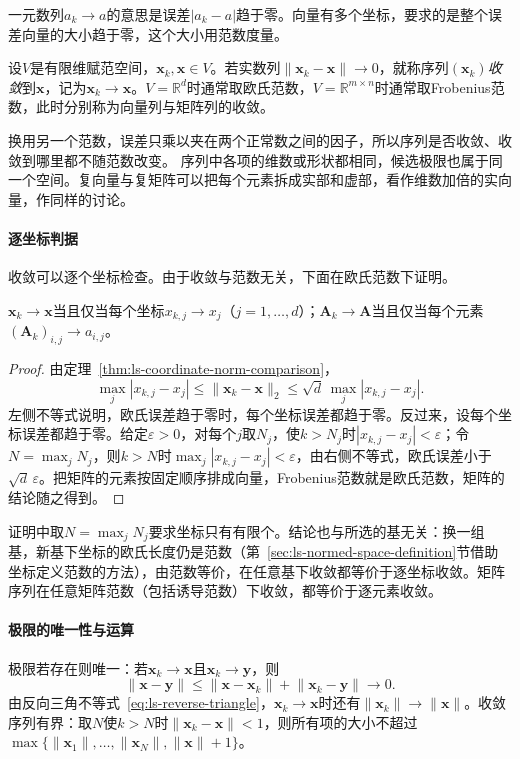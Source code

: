 一元数列$a_k\to a$的意思是误差$|a_k-a|$趋于零。向量有多个坐标，要求的是整个误差向量的大小趋于零，这个大小用范数度量。
\begin{definition}[向量列与矩阵列的收敛]
\label{def:multivariable-sequence-convergence}
设$V$是有限维赋范空间，$\bm x_k,\bm x\in V$。若实数列$\lVert\bm x_k-\bm x\rVert\to0$，就称序列$(\bm x_k)$\emph{收敛}到$\bm x$，记为$\bm x_k\to\bm x$。$V=\mathbb R^d$时通常取欧氏范数，$V=\mathbb R^{m\times n}$时通常取Frobenius范数，此时分别称为向量列与矩阵列的收敛。
\end{definition}
换用另一个范数，误差只乘以夹在两个正常数之间的因子，所以序列是否收敛、收敛到哪里都不随范数改变。
序列中各项的维数或形状都相同，候选极限也属于同一个空间。复向量与复矩阵可以把每个元素拆成实部和虚部，看作维数加倍的实向量，作同样的讨论。

\paragraph{逐坐标判据}
收敛可以逐个坐标检查。由于收敛与范数无关，下面在欧氏范数下证明。
\begin{theorem}[收敛等价于逐坐标收敛]
\label{thm:multivariable-coordinatewise-convergence}
$\bm x_k\to\bm x$当且仅当每个坐标$x_{k,j}\to x_j$（$j=1,\ldots,d$）；$\bm A_k\to\bm A$当且仅当每个元素$(\bm A_k)_{i,j}\to a_{i,j}$。
\end{theorem}
\begin{proof}
由定理~\ref{thm:ls-coordinate-norm-comparison}，
\[
 \max_j|x_{k,j}-x_j|\leq\lVert\bm x_k-\bm x\rVert_2\leq\sqrt d\,\max_j|x_{k,j}-x_j|.
\]
左侧不等式说明，欧氏误差趋于零时，每个坐标误差都趋于零。反过来，设每个坐标误差都趋于零。给定$\varepsilon>0$，对每个$j$取$N_j$，使$k>N_j$时$|x_{k,j}-x_j|<\varepsilon$；令$N=\max_jN_j$，则$k>N$时$\max_j|x_{k,j}-x_j|<\varepsilon$，由右侧不等式，欧氏误差小于$\sqrt d\,\varepsilon$。把矩阵的元素按固定顺序排成向量，Frobenius范数就是欧氏范数，矩阵的结论随之得到。
\end{proof}
证明中取$N=\max_jN_j$要求坐标只有有限个。结论也与所选的基无关：换一组基，新基下坐标的欧氏长度仍是范数（第~\ref{sec:ls-normed-space-definition}节借助坐标定义范数的方法），由范数等价，在任意基下收敛都等价于逐坐标收敛。矩阵序列在任意矩阵范数（包括诱导范数）下收敛，都等价于逐元素收敛。

\paragraph{极限的唯一性与运算}
极限若存在则唯一：若$\bm x_k\to\bm x$且$\bm x_k\to\bm y$，则
\[
 \lVert\bm x-\bm y\rVert\leq\lVert\bm x-\bm x_k\rVert+\lVert\bm x_k-\bm y\rVert\to0.
\]
由反向三角不等式~\eqref{eq:ls-reverse-triangle}，$\bm x_k\to\bm x$时还有$\lVert\bm x_k\rVert\to\lVert\bm x\rVert$。收敛序列有界：取$N$使$k>N$时$\lVert\bm x_k-\bm x\rVert<1$，则所有项的大小不超过$\max\{\lVert\bm x_1\rVert,\ldots,\lVert\bm x_N\rVert,\lVert\bm x\rVert+1\}$。

